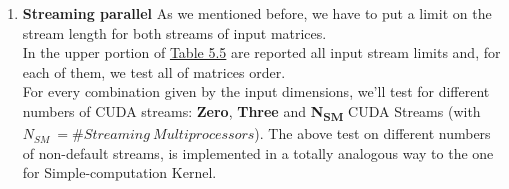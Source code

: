 \begin{enumerate}
	\item \textbf{Streaming parallel}
	As we mentioned before, we have to put a limit on the stream length for both streams of input matrices.\\
	In the upper portion of \hyperref[tab:matdata]{Table 5.5} are reported all input stream limits and, for each of them, we test all of matrices order.\\
	For every combination given by the input dimensions, we'll test for different numbers of CUDA streams: \textbf{Zero}, \textbf{Three} and \textbf{N\textsubscript{SM}} CUDA Streams (with \(N_{SM} \ =\# Streaming \ Multiprocessors\)).
	The above test on different numbers of non-default streams, is implemented in a totally analogous way to the one for Simple-computation Kernel.
\end{enumerate}



